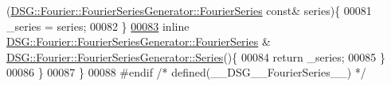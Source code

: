 \begin{DoxyCode}
      (\hyperlink{class_d_s_g_1_1_fourier_1_1_fourier_series_generator_a32ffe02b67ac07db92ad41e3ee366c94}{DSG::Fourier::FourierSeriesGenerator::FourierSeries} \textcolor{keyword}{
      const}& series)\{
00081             \_series = series;
00082         \}
\hypertarget{_fourier_series_8h_source_l00083}{}\hyperlink{class_d_s_g_1_1_fourier_1_1_fourier_series_generator_a4ed12eb61fe931ceceaeb59a2986a147}{00083}         \textcolor{keyword}{inline} \hyperlink{class_d_s_g_1_1_fourier_1_1_fourier_series_generator_a32ffe02b67ac07db92ad41e3ee366c94}{DSG::Fourier::FourierSeriesGenerator::FourierSeries}
      & \hyperlink{class_d_s_g_1_1_fourier_1_1_fourier_series_generator_a4ed12eb61fe931ceceaeb59a2986a147}{DSG::Fourier::FourierSeriesGenerator::Series}()\{
00084             \textcolor{keywordflow}{return} \_series;
00085         \}
00086     \}
00087 \}
00088 \textcolor{preprocessor}{#endif }\textcolor{comment}{/* defined(\_\_DSG\_\_FourierSeries\_\_) */}\textcolor{preprocessor}{}
\end{DoxyCode}
